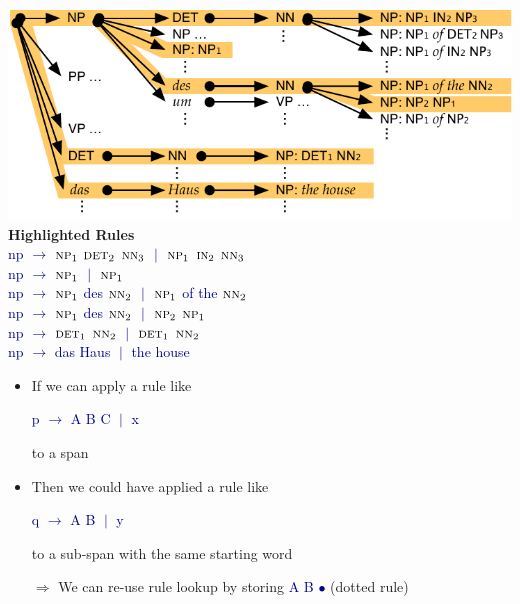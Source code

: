 \documentclass[landscape]{slides}
\newcommand{\example}[1]{\textcolor{darkblue}{\rm #1}}
\begin{document}
\begin{center}
\includegraphics[scale=1.4]{accessing-grammar-rules-prefix.pdf}\\[2mm]
{\bf Highlighted Rules}\\
\example{
{\sc np} $\rightarrow$ 
$\text{\sc np}_1$ $\text{\sc det}_2$ $\text{\sc nn}_3$ $\;|\;$
$\text{\sc np}_1$ $\text{\sc in}_2$ $\text{\sc nn}_3$ \\
{\sc np} $\rightarrow$ 
$\text{\sc np}_1$ $\;|\;$
$\text{\sc np}_1$ \\
{\sc np} $\rightarrow$ 
$\text{\sc np}_1$ des $\text{\sc nn}_2$ $\;|\;$
$\text{\sc np}_1$ of the $\text{\sc nn}_2$ \\
{\sc np} $\rightarrow$ 
$\text{\sc np}_1$ des $\text{\sc nn}_2$ $\;|\;$
$\text{\sc np}_2$ $\text{\sc np}_1$ \\
{\sc np} $\rightarrow$ 
$\text{\sc det}_1$ $\text{\sc nn}_2$ $\;|\;$
$\text{\sc det}_1$ $\text{\sc nn}_2$ \\
{\sc np} $\rightarrow$ 
das Haus $\;|\;$
the house}
\end{center}


\vspace{10mm}
\begin{itemize}\itemsep 10mm
\item If we can apply a rule like
\begin{center}\vspace{-5mm}
\example{p $\rightarrow$ A B C $\;|\;$ x}
\end{center}\vspace{-5mm}
to a span
\item Then we could have applied a rule like
\begin{center}\vspace{-5mm}
\example{q $\rightarrow$ A B $\;|\;$ y}
\end{center}\vspace{-5mm}
to a sub-span with the same starting word
\item[$\Rightarrow$] We can re-use rule lookup by storing \example{A B $\bullet$} (dotted rule)
\end{itemize}
\end{document}
